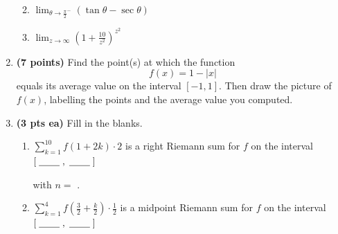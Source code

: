 \documentclass[12pt,letterpaper]{article}
\begin{document}
\begin{enumerate}[1.]
\begin{enumerate}
	\vspace{24pc}
	\item $\displaystyle\lim_{\theta\to \frac{\pi}{2}^-}(\tan{\theta}-\sec{\theta})$
	
	\newpage
	\item $\displaystyle\lim_{z\to\infty}\left(1+\frac{10}{z^2}\right)^{z^2}$
	\end{enumerate}

\newpage
\item {\bf (7 points)} Find the point(s) at which the function 
\[f(x)=1-|x|\]
equals its average value on the interval $[-1,1]$.  Then draw the picture of $f(x)$, labelling the points and the average value you computed.
	
\newpage
\item {\bf (3 pts ea)} Fill in the blanks. %
	
	\vspace{0.5pc}
	\begin{enumerate}
	\item $\displaystyle\sum_{k=1}^{10}f(1+2k)\cdot 2$ is a right
	Riemann sum for $f$ on the interval $\left[\;\underline{\hspace{5ex}}\;,\;\underline{\hspace{5ex}}\;\right]$
	
	\hspace{8pc}with $n=$ \underline{\hspace{5ex}} .
	
	\vspace{11pc}
	\item $\displaystyle\sum_{k=1}^{4}f\left(\frac{3}{2}+\frac{k}{2}\right)\cdot\frac{1}{2}$ is a midpoint
	Riemann sum for $f$ on the interval $\left[\;\underline{\hspace{5ex}}\;,\;\underline{\hspace{5ex}}\;\right]$
	

\end{enumerate}
\end{enumerate}
\end{document}
